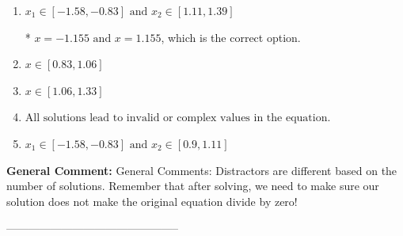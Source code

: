 \documentclass{extbook}[14pt]
\begin{document}
\begin{enumerate}[label=\Alph*.] 
\item $ x_1 \in [-1.58, -0.83] \text{ and } x_2 \in [1.11,1.39] $ 

 * $x = -1.155 \text{ and } x = 1.155$, which is the correct option. 
\item $ x \in [0.83,1.06] $ 

  
\item $ x \in [1.06,1.33] $ 

  
\item $ \text{All solutions lead to invalid or complex values in the equation.} $ 

  
\item $ x_1 \in [-1.58, -0.83] \text{ and } x_2 \in [0.9,1.11] $ 

  
\end{enumerate} 
 
\textbf{General Comment:} General Comments: Distractors are different based on the number of solutions. Remember that after solving, we need to make sure our solution does not make the original equation divide by zero! 

-----------------------------------------------
\end{document}
